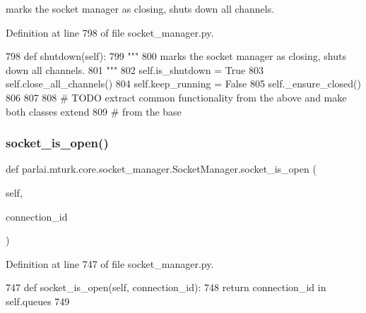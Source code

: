 \begin{DoxyVerb}marks the socket manager as closing, shuts down all channels.
\end{DoxyVerb}
 

Definition at line 798 of file socket\+\_\+manager.\+py.


\begin{DoxyCode}
798     \textcolor{keyword}{def }shutdown(self):
799         \textcolor{stringliteral}{"""}
800 \textcolor{stringliteral}{        marks the socket manager as closing, shuts down all channels.}
801 \textcolor{stringliteral}{        """}
802         self.is\_shutdown = \textcolor{keyword}{True}
803         self.close\_all\_channels()
804         self.keep\_running = \textcolor{keyword}{False}
805         self.\_ensure\_closed()
806 
807 
808 \textcolor{comment}{# TODO extract common functionality from the above and make both classes extend}
809 \textcolor{comment}{# from the base}
\end{DoxyCode}
\mbox{\label{classparlai_1_1mturk_1_1core_1_1socket__manager_1_1SocketManager_a895934ce725c0770e94ff6ba0842078e}} 
\subsubsection{\texorpdfstring{socket\+\_\+is\+\_\+open()}{socket\_is\_open()}}
{\footnotesize\ttfamily def parlai.\+mturk.\+core.\+socket\+\_\+manager.\+Socket\+Manager.\+socket\+\_\+is\+\_\+open (\begin{DoxyParamCaption}\item[{}]{self,  }\item[{}]{connection\+\_\+id }\end{DoxyParamCaption})}



Definition at line 747 of file socket\+\_\+manager.\+py.


\begin{DoxyCode}
747     \textcolor{keyword}{def }socket\_is\_open(self, connection\_id):
748         \textcolor{keywordflow}{return} connection\_id \textcolor{keywordflow}{in} self.queues
749 
\end{DoxyCode}


